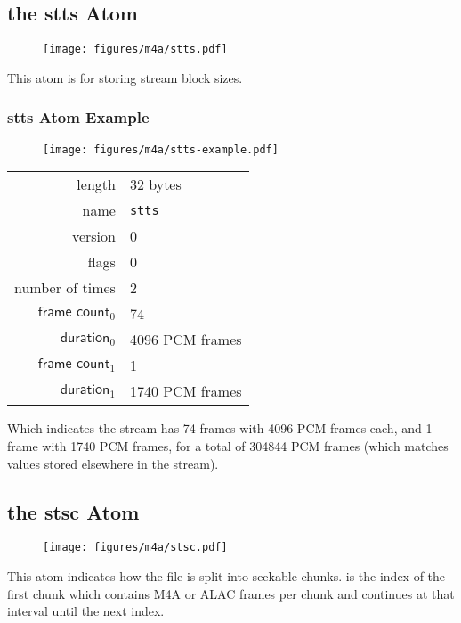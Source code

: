 

\subsection{the stts Atom}
\begin{figure}[h]
  \texttt{[image: figures/m4a/stts.pdf]}
\end{figure}
\par
\noindent
This atom is for storing stream block sizes.
\subsubsection{stts Atom Example}
\begin{figure}[h]
  \texttt{[image: figures/m4a/stts-example.pdf]}
\end{figure}
\par
\noindent
\begin{tabular}{rl}
  \textsf{length} & 32 bytes \\
  \textsf{name} & \texttt{stts} \\
  \textsf{version} & 0 \\
  \textsf{flags} & 0 \\
  \textsf{number of times} & 2 \\
  $\textsf{frame count}_0$ & 74 \\
  $\textsf{duration}_0$ & 4096 PCM frames \\
  $\textsf{frame count}_1$ & 1 \\
  $\textsf{duration}_1$ & 1740 PCM frames \\
\end{tabular}
\par
\noindent
Which indicates the stream has 74 frames with 4096 PCM frames each,
and 1 frame with 1740 PCM frames, for a total of 304844 PCM frames
(which matches values stored elsewhere in the stream).

\clearpage

\subsection{the stsc Atom}

\begin{figure}[h]
  \texttt{[image: figures/m4a/stsc.pdf]}
\end{figure}
\par
\noindent
This atom indicates how the file is split into seekable chunks.
 is the index of the first chunk
which contains  M4A or ALAC frames per
chunk and continues at that interval until the next index.

